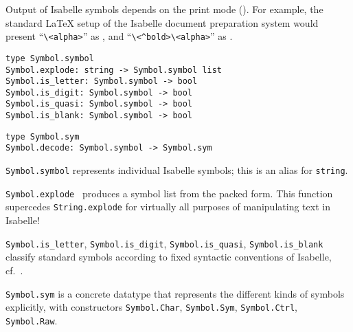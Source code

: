 \begin{isabellebody}
\begin{isamarkuptext}
  \medskip Output of Isabelle symbols depends on the print mode
  ().  For example, the standard {\LaTeX} setup of the
  Isabelle document preparation system would present
  ``\verb,\,\verb,<alpha>,'' as \isa{{\isasymalpha}}, and
  ``\verb,\,\verb,<^bold>,\verb,\,\verb,<alpha>,'' as \isa{\isactrlbold {\isasymalpha}}.%
\end{isamarkuptext}%
\isamarkuptrue%
%
\isadelimmlref
%
\endisadelimmlref
%
\isatagmlref
%
\begin{isamarkuptext}%
\begin{mldecls}
  \verb|type Symbol.symbol| \\
  \verb|Symbol.explode: string -> Symbol.symbol list| \\
  \verb|Symbol.is_letter: Symbol.symbol -> bool| \\
  \verb|Symbol.is_digit: Symbol.symbol -> bool| \\
  \verb|Symbol.is_quasi: Symbol.symbol -> bool| \\
  \verb|Symbol.is_blank: Symbol.symbol -> bool| \\
  \end{mldecls}
  \begin{mldecls}
  \verb|type Symbol.sym| \\
  \verb|Symbol.decode: Symbol.symbol -> Symbol.sym| \\
  \end{mldecls}

  \begin{description}

  \item \verb|Symbol.symbol| represents individual Isabelle
  symbols; this is an alias for \verb|string|.

  \item \verb|Symbol.explode|~ produces a symbol list
  from the packed form.  This function supercedes \verb|String.explode| for virtually all purposes of manipulating text in
  Isabelle!

  \item \verb|Symbol.is_letter|, \verb|Symbol.is_digit|, \verb|Symbol.is_quasi|, \verb|Symbol.is_blank| classify standard
  symbols according to fixed syntactic conventions of Isabelle, cf.\
  \cite{isabelle-isar-ref}.

  \item \verb|Symbol.sym| is a concrete datatype that represents
  the different kinds of symbols explicitly, with constructors \verb|Symbol.Char|, \verb|Symbol.Sym|, \verb|Symbol.Ctrl|, \verb|Symbol.Raw|.


\end{description}
\end{isamarkuptext}
\end{isabellebody}
